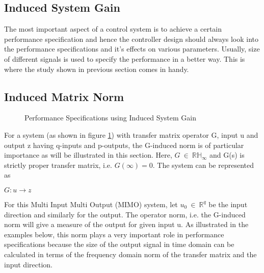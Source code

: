 \documentclass[a4paper,12pt]{article}
\begin{document}
\subsection{Induced System Gain} The most important aspect of a control system is to achieve a certain performance specification and hence the controller design should always look into the performance specifications and it's effects on various parameters. Usually, size of different signals is used to specify the performance in a better way. This is where the study shown in previous section comes in handy.
	\subsection{Induced Matrix Norm} 
	\begin{figure}[H]
 
			  \centering
			  
%			  
			  \def\svgscale{0.3}
			  \tiny{
			  
			  }
			  \caption{Performance Specifications using Induced System Gain}
			 \label{perf}
		\end{figure}
	For a system (as shown in figure \ref{perf}) with transfer matrix operator G, input u and output z having q-inputs and p-outputs, the G-induced norm is of particular importance as will be illustrated in this section. Here, $ G \:\in\: \mathbb{R}\mathbb{H}_{\infty} $ and G(s) is strictly proper transfer matrix, i.e. $G(\infty) = 0 $.
	The system can be represented as \\
	\begin{center}
		$G : u \rightarrow z$
	\end{center}
	For this Multi Input Multi Output (MIMO) system, let $u_{0} \: \in \: \mathbb{R}^{q} $ be the input direction and similarly for the output. The operator norm, i.e. the G-induced norm will give a measure of the output for given input u. As illustrated in the examples below, this norm plays a very important role in performance specifications because the size of the output signal in time domain can be calculated in terms of the frequency domain norm of the transfer matrix and the input direction. 
\end{document}
